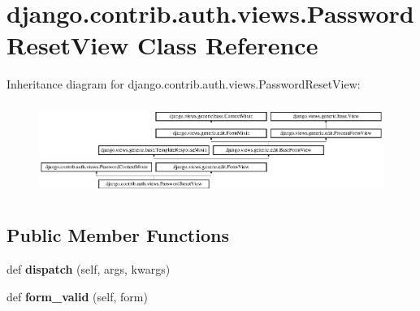\hypertarget{classdjango_1_1contrib_1_1auth_1_1views_1_1_password_reset_view}{}\section{django.\+contrib.\+auth.\+views.\+Password\+Reset\+View Class Reference}
\label{classdjango_1_1contrib_1_1auth_1_1views_1_1_password_reset_view}
Inheritance diagram for django.\+contrib.\+auth.\+views.\+Password\+Reset\+View\+:\begin{figure}[H]
\begin{center}
\leavevmode
\includegraphics[height=3.001072cm]{classdjango_1_1contrib_1_1auth_1_1views_1_1_password_reset_view}
\end{center}
\end{figure}
\subsection*{Public Member Functions}
\begin{DoxyCompactItemize}
\item 
\mbox{\label{classdjango_1_1contrib_1_1auth_1_1views_1_1_password_reset_view_a0732b84ba23e68f9070c75ca90dfd4ef}} 
def {\bfseries dispatch} (self, args, kwargs)
\item 
\mbox{\label{classdjango_1_1contrib_1_1auth_1_1views_1_1_password_reset_view_a0265c76f56022650ec841d6d3f2a20de}} 
def {\bfseries form\+\_\+valid} (self, form)
\end{DoxyCompactItemize}
